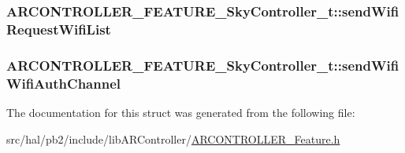\subsubsection[{\texorpdfstring{send\+Wifi\+Request\+Wifi\+List}{sendWifiRequestWifiList}}]{ A\+R\+C\+O\+N\+T\+R\+O\+L\+L\+E\+R\+\_\+\+F\+E\+A\+T\+U\+R\+E\+\_\+\+Sky\+Controller\+\_\+t\+::send\+Wifi\+Request\+Wifi\+List}\hypertarget{struct_a_r_c_o_n_t_r_o_l_l_e_r___f_e_a_t_u_r_e___sky_controller__t_a7ca9da558fb683e16e51a4eb993cf039}{}\label{struct_a_r_c_o_n_t_r_o_l_l_e_r___f_e_a_t_u_r_e___sky_controller__t_a7ca9da558fb683e16e51a4eb993cf039}
\subsubsection[{\texorpdfstring{send\+Wifi\+Wifi\+Auth\+Channel}{sendWifiWifiAuthChannel}}]{ A\+R\+C\+O\+N\+T\+R\+O\+L\+L\+E\+R\+\_\+\+F\+E\+A\+T\+U\+R\+E\+\_\+\+Sky\+Controller\+\_\+t\+::send\+Wifi\+Wifi\+Auth\+Channel}\hypertarget{struct_a_r_c_o_n_t_r_o_l_l_e_r___f_e_a_t_u_r_e___sky_controller__t_a181059a95baee3110341b1e23d74a936}{}\label{struct_a_r_c_o_n_t_r_o_l_l_e_r___f_e_a_t_u_r_e___sky_controller__t_a181059a95baee3110341b1e23d74a936}


The documentation for this struct was generated from the following file\+:\begin{DoxyCompactItemize}
\item 
src/hal/pb2/include/lib\+A\+R\+Controller/\hyperlink{_a_r_c_o_n_t_r_o_l_l_e_r___feature_8h}{A\+R\+C\+O\+N\+T\+R\+O\+L\+L\+E\+R\+\_\+\+Feature.\+h}\end{DoxyCompactItemize}
